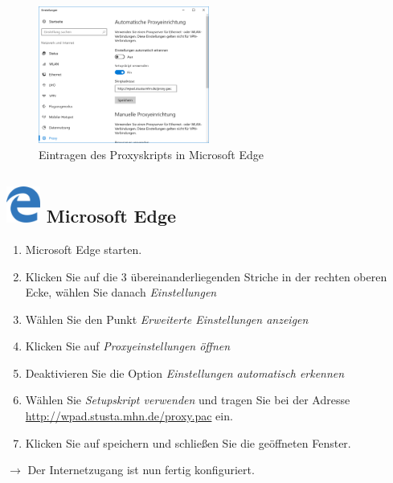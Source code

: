 \documentclass[a4paper,12pt]{scrartcl}
\begin{document}
\begin{figure}
	\begin{center}
		\includegraphics[width=0.5\textwidth,keepaspectratio]{Bilder/Proxy_Edge}
	\end{center}
	\caption{Eintragen des Proxyskripts in Microsoft Edge}
\end{figure}

\subsection*{\includegraphics[height=1.2cm,keepaspectratio]{Bilder/Mcrosoft_Edge_logo} Microsoft Edge}
\begin{enumerate}
	\item Microsoft Edge starten.
	\item Klicken Sie auf die 3 übereinanderliegenden Striche in der rechten oberen Ecke, wählen Sie danach \emph{Einstellungen}
	\item Wählen Sie den Punkt \emph{Erweiterte Einstellungen anzeigen}
	\item Klicken Sie auf \emph{Proxyeinstellungen öffnen}
	\item Deaktivieren Sie die Option \emph{Einstellungen automatisch erkennen}
	\item Wählen Sie \emph{Setupskript verwenden} und tragen Sie bei der Adresse \\ \url{http://wpad.stusta.mhn.de/proxy.pac} ein.
	\item Klicken Sie auf speichern und schließen Sie die geöffneten 
	Fenster.
\end{enumerate}
$\rightarrow$ Der Internetzugang ist nun fertig konfiguriert.
\end{document}
